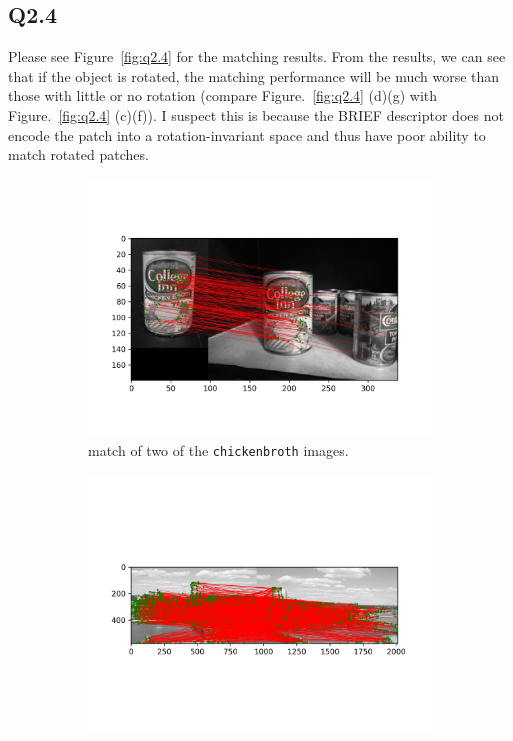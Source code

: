\documentclass[11pt]{article}
\newcommand{\code}[1]{\texttt{#1}}
\begin{document}
\newpage

\subsection*{Q2.4}

Please see Figure~\ref{fig:q2.4} for the matching results. From the results, we can see that if the object is rotated, the matching performance will be much worse than those with little or no rotation (compare Figure.~\ref{fig:q2.4} (d)(g) with Figure.~\ref{fig:q2.4} (c)(f)). I suspect this is because the BRIEF descriptor does not encode the patch into a rotation-invariant space and thus have poor ability to match rotated patches.

\begin{figure}[h!]
    \begin{subfigure}{.49\textwidth}
      \centering
      \includegraphics[width=.8\linewidth]{../results/chickenbroth_01_match.jpg}
      \caption{match of two of the \code{chickenbroth} images.}
    \end{subfigure}
    \begin{subfigure}{.49\textwidth}
      \centering
      \includegraphics[width=.8\linewidth]{../results/incline_match.jpg}

\end{subfigure}
\end{figure}
\end{document}
